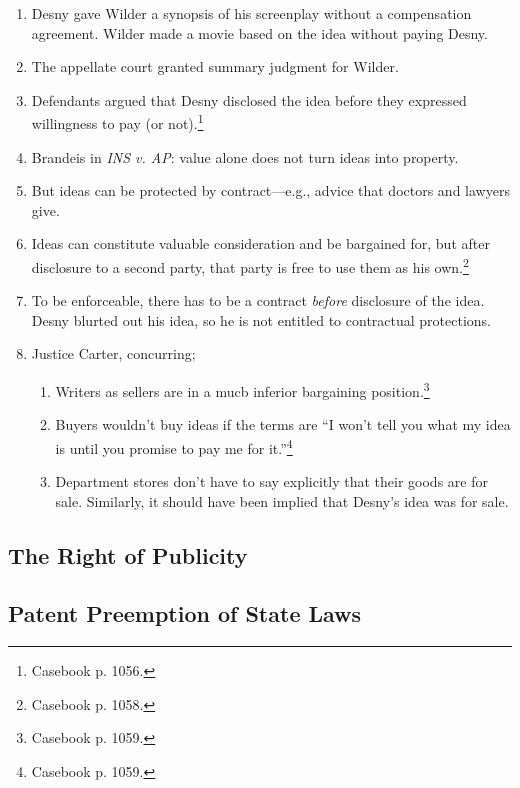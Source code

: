 \begin{enumerate}
    \item Desny gave Wilder a synopsis of his screenplay without a 
    compensation agreement. Wilder made a movie based on the idea without 
    paying Desny.
    \item The appellate court granted summary judgment for Wilder.
    \item Defendants argued that Desny disclosed the idea before they 
    expressed willingness to pay (or not).\footnote{Casebook p. 1056.}
    \item Brandeis in \emph{INS v. AP}: value alone does not turn ideas into 
    property.
    \item But ideas can be protected by contract---e.g., advice that doctors 
    and lawyers give.
    \item Ideas can constitute valuable consideration and be bargained for, 
    but after disclosure to a second party, that party is free to use them as 
    his own.\footnote{Casebook p. 1058.}
    \item To be enforceable, there has to be a contract \emph{before} 
    disclosure of the idea. Desny blurted out his idea, so he is not entitled 
    to contractual protections.
    \item Justice Carter, concurring;
    \begin{enumerate}
        \item Writers as sellers are in a mucb inferior bargaining 
        position.\footnote{Casebook p. 1059.}
        \item Buyers wouldn't buy ideas if the terms are ``I won't tell you 
        what my idea is until you promise to pay me for 
        it.''\footnote{Casebook p. 1059.}
        \item Department stores don't have to say explicitly that their goods 
        are for sale. Similarly, it should have been implied that Desny's idea 
        was for sale.
    \end{enumerate}
\end{enumerate}

\newpage %

\subsection{The Right of Publicity}


\subsection{Patent Preemption of State Laws}

